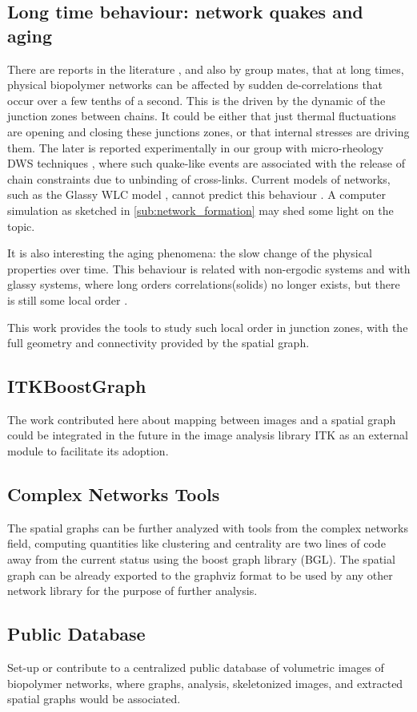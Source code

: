 \subsection{Long time behaviour: network quakes and aging}
\label{sub:quakes}
There are reports in the literature \citep{kajiya_slow_2013}, and also by group
mates\citep{vincent_micro-rheological_2013, mansel_internal_2015}, that at long times, physical
biopolymer networks can be affected by sudden de-correlations that occur over a
few tenths of a second. This is the driven by the dynamic of the junction zones between chains. It could be either that just thermal fluctuations are opening and closing these junctions zones, or that internal stresses are driving them.
The later is reported experimentally in our group  with micro-rheology DWS techniques \cite{mansel_internal_2015}, where such quake-like events are associated with the release of chain constraints due to unbinding of cross-links.
Current models of networks, such as the Glassy WLC model
\citep{kroy_glassy_2007}, cannot predict this behaviour \citep{vincent_micro-rheological_2013}.  A
computer simulation as sketched in \autoref{sub:network_formation} may shed some light on the topic.

It is also interesting the aging phenomena: the slow change of the physical
properties over time. This behaviour is related with non-ergodic systems and
with glassy systems, where long orders correlations(solids) no longer exists,
but there is still some local order \citep{cipelletti_slow_????}.

This work provides the tools to study such local order in junction zones, with the full geometry and connectivity provided by the spatial graph.

\subsection{ITKBoostGraph}%
\label{sub:itkboostgraph}

  The work contributed here about mapping between images and a spatial graph could be integrated in the future in the image analysis library ITK as an external module to facilitate its adoption.

\subsection{Complex Networks Tools}%
\label{sub:complex_networks_tools}

The spatial graphs can be further analyzed with tools from the complex networks field, computing quantities like clustering and centrality are two lines of code away from the current status using the boost graph library (BGL). The spatial graph can be already exported to the graphviz format to be used by any other network library for the purpose of further analysis.

\subsection{Public Database}%
\label{sub:public_database}

  Set-up or contribute to a centralized public database of volumetric images of biopolymer networks, where graphs, analysis, skeletonized images, and extracted spatial graphs would be associated.
